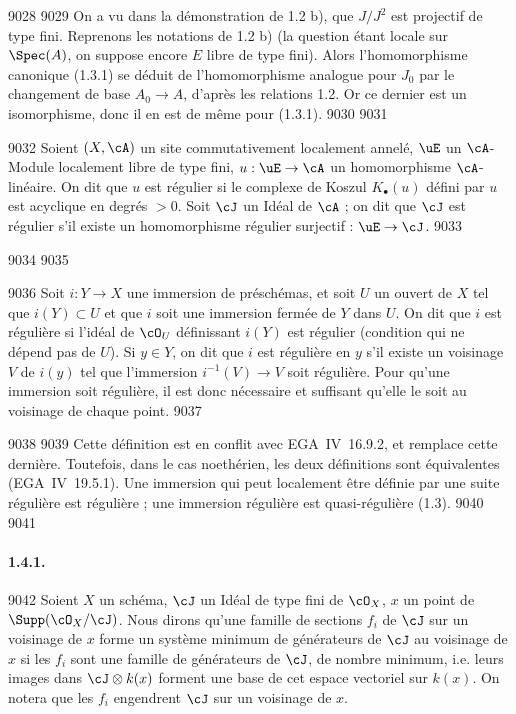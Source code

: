   9028	
  9029	On a vu dans la d\'emonstration de 1.2 b), que $J/J^2$ est projectif de type fini. Reprenons les notations de 1.2 b) (la question \'etant locale sur $\Spec(A)$, on suppose encore $E$ libre de type fini). Alors l'homomorphisme canonique (1.3.1) se d\'eduit de l'homomorphisme analogue pour $J_0$ par le changement de base $A_0 \to A$, d'apr\`es les relations 1.2. Or ce dernier est un isomorphisme, donc il en est de m\^eme pour (1.3.1).
  9030	
  9031	\begin{definition}[1.4]
  9032	Soient $(X,\cA)$ un site commutativement localement annel\'e, $\uE$ un $\cA$-Module localement libre de type fini, $u: \uE \to \cA$ un homomorphisme $\cA$-lin\'eaire. On dit que $u$ est r\'egulier si le complexe de Koszul $K_{\bullet}(u)$ d\'efini par $u$ est acyclique en degr\'es $> 0$. Soit $\cJ$ un Id\'eal de $\cA$ ; on dit que $\cJ$ est r\'egulier s'il existe un homomorphisme r\'egulier surjectif : $\uE \to \cJ$.
  9033	\end{definition}
  9034	
  9035	\begin{definition}[1.5]
  9036	Soit $i: Y \to X$ une immersion de pr\'esch\'emas, et soit $U$ un ouvert de $X$ tel que $i(Y) \subset U$ et que $i$ soit une immersion ferm\'ee de $Y$ dans $U$. On dit que $i$ est r\'eguli\`ere si l'id\'eal de $\cO_U$ d\'efinissant $i(Y)$ est r\'egulier (condition qui ne d\'epend pas de $U$). Si $y \in Y$, on dit que $i$ est r\'eguli\`ere en $y$ s'il existe un voisinage $V$ de $i(y)$ tel que l'immersion $i^{-1}(V) \to V$ soit r\'eguli\`ere. Pour qu'une immersion soit r\'eguli\`ere, il est donc n\'ecessaire et suffisant qu'elle le soit au voisinage de chaque point.
  9037	\end{definition}
  9038	
  9039	Cette d\'efinition est en conflit avec EGA~IV~16.9.2, et remplace cette derni\`ere. Toutefois, dans le cas noeth\'erien, les deux d\'efinitions sont \'equivalentes (EGA~IV~19.5.1). Une immersion qui peut localement \^etre d\'efinie par une suite r\'eguli\`ere est r\'eguli\`ere ; une immersion r\'eguli\`ere est quasi-r\'eguli\`ere (1.3).
  9040	
  9041	\paragraph{1.4.1.}
  9042	Soient $X$ un sch\'ema, $\cJ$ un Id\'eal de type fini de $\cO_X$, $x$ un point de $\Supp(\cO_X/\cJ)$. Nous dirons qu'une famille de sections $f_i$ de $\cJ$ sur un voisinage de $x$ forme un syst\`eme minimum de g\'en\'erateurs de $\cJ$ au voisinage de $x$ si les $f_i$ sont une famille de g\'en\'erateurs de $\cJ$, de nombre minimum, i.e. leurs images dans $\cJ \otimes k(x)$ forment une base de cet espace vectoriel sur $k(x)$. On notera que les $f_i$ engendrent $\cJ$ sur un voisinage de $x$.
